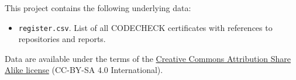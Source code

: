 \documentclass[12pt]{article}
\begin{document}
This project contains the following underlying data:

\begin{itemize}
  \item \texttt{register.csv}. List of all CODECHECK certificates with references to repositories and reports.
\end{itemize}

Data are available under the terms of the \href{https://creativecommons.org/licenses/by-sa/4.0/legalcode}{Creative Commons Attribution Share Alike license} (CC-BY-SA 4.0 International).

{\small
}
\end{document}
